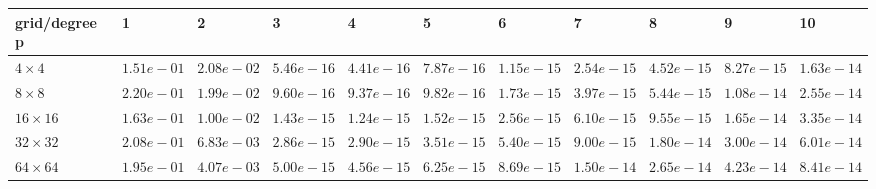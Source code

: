 \begin{tabular}{lllllllllll}
\hline
 grid/degree p   & 1          & 2          & 3          & 4          & 5          & 6          & 7          & 8          & 9          & 10         \\
\hline
 $4 \times 4$    & $1.51e-01$ & $2.08e-02$ & $5.46e-16$ & $4.41e-16$ & $7.87e-16$ & $1.15e-15$ & $2.54e-15$ & $4.52e-15$ & $8.27e-15$ & $1.63e-14$ \\
 $8 \times 8$    & $2.20e-01$ & $1.99e-02$ & $9.60e-16$ & $9.37e-16$ & $9.82e-16$ & $1.73e-15$ & $3.97e-15$ & $5.44e-15$ & $1.08e-14$ & $2.55e-14$ \\
 $16 \times 16$  & $1.63e-01$ & $1.00e-02$ & $1.43e-15$ & $1.24e-15$ & $1.52e-15$ & $2.56e-15$ & $6.10e-15$ & $9.55e-15$ & $1.65e-14$ & $3.35e-14$ \\
 $32 \times 32$  & $2.08e-01$ & $6.83e-03$ & $2.86e-15$ & $2.90e-15$ & $3.51e-15$ & $5.40e-15$ & $9.00e-15$ & $1.80e-14$ & $3.00e-14$ & $6.01e-14$ \\
 $64 \times 64$  & $1.95e-01$ & $4.07e-03$ & $5.00e-15$ & $4.56e-15$ & $6.25e-15$ & $8.69e-15$ & $1.50e-14$ & $2.65e-14$ & $4.23e-14$ & $8.41e-14$ \\
\hline
\end{tabular}